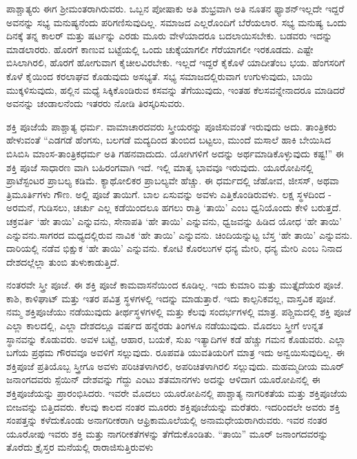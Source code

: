 ಪಾಶ್ಚಾತ್ಯರು ಈಗ ಶ‍್ರೀಮಂತರಾಗಿರುವರು. ಒಬ್ಬನ ಪೋಷಾಕು ಅತಿ ಶುಭ್ರವಾಗಿ ಅತಿ ನೂತನ ಫ್ಯಾಶನ್​ ಇಲ್ಲದೇ ಇದ್ದರೆ ಅವನನ್ನು ಸಭ್ಯ ಮನುಷ್ಯನೆಂದು ಪರಿಗಣಿಸುವುದಿಲ್ಲ. ಸಮಾಜದ ಎಲ್ಲರೊಂದಿಗೆ ಬೆರೆಯಲಾರ. ಸಭ್ಯ ಮನುಷ್ಯ ಒಂದು ದಿನಕ್ಕೆ ತನ್ನ ಕಾಲರ್​ ಮತ್ತು ಷರ್ಟನ್ನು ಎರಡು ಮೂರು ವೇಳೆಯಾದರೂ ಬದಲಾಯಿಸಬೇಕು. ಬಡವರು ಇದನ್ನು ಮಾಡಲಾರರು. ಹೊರಗೆ ಕಾಣುವ ಬಟ್ಟೆಯಲ್ಲಿ ಒಂದು ಚುಕ್ಕೆಯಾಗಲೀ ಗೆರೆ\break ಯಾಗಲೀ ಇರಕೂಡದು. ಎಷ್ಟೇ ಬಿಸಿಲಾಗಿರಲಿ, ಹೊರಗೆ ಹೋಗುವಾಗ ಕೈಚೀಲವಿರಬೇಕು. ಇಲ್ಲದೆ ಇದ್ದರೆ ಕೈಕೊಳೆ ಯಾದೀತೆಂಬ ಭಯ. ಹೆಂಗಸರಿಗೆ ಕೊಳೆ ಕೈಯಿಂದ ಕರಲಾಘವ ಕೊಡುವುದು ಅಸಭ್ಯತೆ. ಸಭ್ಯ ಸಮಾಜದಲ್ಲಿರುವಾಗ ಉಗುಳುವುದು, ಬಾಯಿ ಮುಕ್ಕಳಿಸು\break ವುದು, ಹಲ್ಲಿನ ಮಧ್ಯೆ ಸಿಕ್ಕಿಕೊಂಡಿರುವ ಕಸವನ್ನು ತೆಗೆಯುವುದು, ಇಂತಹ ಕೆಲಸವನ್ನೇ\break ನಾದರೂ ಮಾಡಿದರೆ ಅವನನ್ನು ಚಂಡಾಲನೆಂದು ಇತರರು ನೋಡಿ ತಿರಸ್ಕರಿಸುವರು.

ಶಕ್ತಿ ಪೂಜೆಯೆ ಪಾಶ್ಚಾತ್ಯ ಧರ್ಮ. ವಾಮಾಚಾರದವರು ಸ್ತ್ರೀಯರನ್ನು ಪೂಜಿಸುವಂತೆ ಇರುವುದು ಅದು. ತಾಂತ್ರಿಕರು ಹೇಳುವಂತೆ “ಎಡಗಡೆ ಹೆಂಗಸು, ಬಲಗಡೆ ಮದ್ಯದಿಂದ ತುಂಬಿದ ಬಟ್ಟಲು, ಮುಂದೆ ಮಸಾಲೆ ಹಾಕಿ ಬೇಯಿಸಿದ ಬಿಸಿಬಿಸಿ ಮಾಂಸ-ತಾಂತ್ರಿಕಧರ್ಮ ಅತಿ ಗಹನವಾದುದು. ಯೋಗಿಗಳಿಗೆ ಅದನ್ನು ಅರ್ಥಮಾಡಿಕೊಳ್ಳುವುದು ಕಷ್ಟ!” ಈ ಶಕ್ತಿ ಪೂಜೆ ಸಾಧಾರಣ ವಾಗಿ ಬಹಿರಂಗವಾಗಿ ಇದೆ. ಇಲ್ಲಿ ಮಾತೃ ಭಾವವೂ ಇರುವುದು. ಯೂರೋಪಿನಲ್ಲಿ ಪ್ರಾಟೆಸ್ಟಂಟರ ಪ್ರಾಬಲ್ಯ ಕಡಿಮೆ. ಕ್ಯಾಥೋಲಿಕರ ಪ್ರಾಬಲ್ಯವೇ ಹೆಚ್ಚು. ಈ ಧರ್ಮದಲ್ಲಿ ಜೆಹೋವ, ಜೀಸಸ್​, ಅಥವಾ ತ್ರಿಮೂರ್ತಿಗಳು ಗೌಣ. ಅಲ್ಲಿ ಪೂಜೆ ತಾಯಿಗೆ. ಬಾಲ ಏಸುವನ್ನು ಅವಳು ಎತ್ತಿಕೊಂಡಿರುವಳು. ಲಕ್ಷ ಸ್ಥಳದಿಂದ - ಅರಮನೆ, ಗುಡಿಸಲು, ಚರ್ಚು ಎಲ್ಲ ಕಡೆಯಿಂದಲೂ ಹಗಲು ರಾತ್ರಿ ‘ತಾಯಿ’ ಎಂಬ ಧ್ವನಿಯೊಂದು ಕೇಳಿ ಬರುತ್ತದೆ. ಚಕ್ರವರ್ತಿ ‘ಹೇ ತಾಯಿ’ ಎನ್ನುವನು, ಸೇನಾಪತಿ ‘ಹೇ ತಾಯಿ’ ಎನ್ನುವನು, ಧ್ವಜವನ್ನು ಹಿಡಿದ ಯೋಧ ‘ಹೇ ತಾಯಿ’ ಎನ್ನುವನು.\break ಸಾಗರದ ಮಧ್ಯದಲ್ಲಿರುವ ನಾವಿಕ ‘ಹೇ ತಾಯಿ’ ಎನ್ನುವನು. ಚಿಂದಿಯನ್ನುಟ್ಟ ಬೆಸ್ತ `ಹೇ ತಾಯಿ’ ಎನ್ನುವನು. ದಾರಿಯಲ್ಲಿ ನಡೆವ ಭಿಕ್ಷುಕ `ಹೇ ತಾಯಿ’ ಎನ್ನುವನು. ಕೋಟಿ ಕೊರಲುಗಳ ಧನ್ಯ ಮೇರಿ, ಧನ್ಯ ಮೇರಿ ಎಂಬ ನಿನಾದ ದೇಶದಲ್ಲೆಲ್ಲಾ ತುಂಬಿ ತುಳುಕಾಡುತ್ತಿದೆ.

ನಂತರವೇ ಸ್ತ್ರೀ ಪೂಜೆ. ಈ ಶಕ್ತಿ ಪೂಜೆ ಕಾಮವಾಸನೆಯಿಂದ ಕೂಡಿಲ್ಲ. ಇದು ಕುಮಾರಿ ಮತ್ತು ಮುತ್ತೈದೆಯರ ಪೂಜೆ. ಕಾಶಿ, ಕಾಳಿಘಾಟ್​ ಮತ್ತು ಇತರ ಪವಿತ್ರ ಸ್ಥಳಗಳಲ್ಲಿ ಇದನ್ನು ಮಾಡುತ್ತಾರೆ. ಇದು ಕಾಲ್ಪನಿಕವಲ್ಲ, ವಾಸ್ತವಿಕ ಪೂಜೆ. ನಮ್ಮ ಶಕ್ತಿಪೂಜೆಯು ನಡೆಯುವುದು ತೀರ್ಥಸ್ಥಳಗಳಲ್ಲಿ ಮತ್ತು ಕೆಲವು ಸಂದರ್ಭಗಳಲ್ಲಿ ಮಾತ್ರ. ಪಶ್ಚಿಮದಲ್ಲಿ ಶಕ್ತಿ ಪೂಜೆ ಎಲ್ಲಾ ಕಾಲದಲ್ಲಿ, ಎಲ್ಲಾ ದೇಶದಲ್ಲೂ ವರ್ಷದ ಹನ್ನೆರಡು ತಿಂಗಳೂ ನಡೆಯುವುದು. ಮೊದಲು ಸ್ತ್ರೀಗೆ ಉನ್ನತ ಸ್ಥಾನವನ್ನು ಕೊಡುವರು. ಅವಳ ಬಟ್ಟೆ, ಆಹಾರ, ಬಯಕೆ, ಸುಖ ಇತ್ಯಾದಿಗಳ ಕಡೆ ಹೆಚ್ಚು ಗಮನ ಕೊಡುವರು. ಎಲ್ಲಾ ಬಗೆಯ ಪ್ರಥಮ ಗೌರವವೂ ಅವಳಿಗೆ ಸಲ್ಲುವುದು. ರೂಪವತಿ ಯುವತಿಯರಿಗೆ ಮಾತ್ರ ಇದು ಅನ್ವಯಿಸುವುದಿಲ್ಲ. ಈ ಶಕ್ತಿಪೂಜೆ ಪ್ರತಿಯೊಬ್ಬ ಸ್ತ್ರೀಗೂ ಅವಳು ಪರಿಚಿತಳಾಗಿರಲಿ, ಅಪರಿಚಿತಳಾಗಿರಲಿ ಸಲ್ಲುವುದು. ಮಹಮ್ಮದೀಯ ಮೂರ್​ ಜನಾಂಗದವರು ಸ್ಪೆಯಿನ್​ ದೇಶವನ್ನು ಗೆದ್ದು ಎಂಟು ಶತಮಾನಗಳು ಅದನ್ನು ಆಳಿದಾಗ ಯೂರೋಪಿನಲ್ಲಿ ಈ ಶಕ್ತಿಪೂಜೆಯನ್ನು ಪ್ರಾರಂಭಿಸಿದರು. ಇವರೇ ಮೊದಲು ಯೂರೋಪಿನಲ್ಲಿ ಪಾಶ್ಚಾತ್ಯ ನಾಗರಿಕತೆಯ ಮತ್ತು ಶಕ್ತಿಪೂಜೆಯ ಬೀಜವನ್ನು ಬಿತ್ತಿದವರು. ಕೆಲವು ಕಾಲದ ನಂತರ ಮೂರರು ಶಕ್ತಿಪೂಜೆಯನ್ನು ಮರೆತರು. ಇದರಿಂದಲೇ ಅವರು ಶಕ್ತಿ ಸಂಪತ್ತನ್ನು ಕಳೆದುಕೊಂಡು ಅನಾಗರೀಕರಾಗಿ ಆಫ್ರಿಕಾಮೂಲೆಯಲ್ಲಿ ಅನಾಮಧೇಯರಾಗಿರುವರು. ಇವರ ನಂತರ ಯೂರೋಪು ಇವರು ಶಕ್ತಿ ಮತ್ತು ನಾಗರೀಕತೆಗಳನ್ನು ತೆಗೆದುಕೊಂಡಿತು. “ತಾಯಿ” ಮೂರ್ ಜನಾಂಗದವರನ್ನು ತೊರೆದು ಕ್ರೈಸ್ತರ ಮನೆಯಲ್ಲಿ ರಾರಾಜಿಸುತ್ತಿರುವಳು

